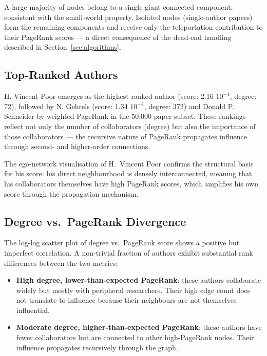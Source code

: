 \documentclass[12pt, a4paper]{article}
\begin{document}
A large majority of nodes belong to a single giant connected component, consistent with the small-world property. Isolated nodes (single-author papers) form the remaining components and receive only the teleportation contribution to their PageRank scores — a direct consequence of the dead-end handling described in Section~\ref{sec:algorithms}.

\subsection{Top-Ranked Authors}

H. Vincent Poor emerges as the highest-ranked author (score: 2.16 \times $10^{-4}$, degree: 72), followed by N. Gehrels (score: 1.34 \times $10^{-4}$, degree: 372) and Donald P. Schneider by weighted PageRank in the 50{,}000-paper subset. These rankings reflect not only the number of collaborators (degree) but also the importance of those collaborators --- the recursive nature of PageRank propagates influence through second- and higher-order connections.

The ego-network visualisation of H.\ Vincent Poor confirms the structural basis for his score: his direct neighbourhood is densely interconnected, meaning that his collaborators themselves have high PageRank scores, which amplifies his own score through the propagation mechanism.

\subsection{Degree vs.\ PageRank Divergence}

The log-log scatter plot of degree vs.\ PageRank score shows a positive but imperfect correlation. A non-trivial fraction of authors exhibit substantial rank differences between the two metrics:

\begin{itemize}
  \item \textbf{High degree, lower-than-expected PageRank}: these authors collaborate widely but mostly with peripheral researchers. Their high edge count does not translate to influence because their neighbours are not themselves influential.
  \item \textbf{Moderate degree, higher-than-expected PageRank}: these authors have fewer collaborators but are connected to other high-PageRank nodes. Their influence propagates recursively through the graph.
\end{itemize}
\end{document}
